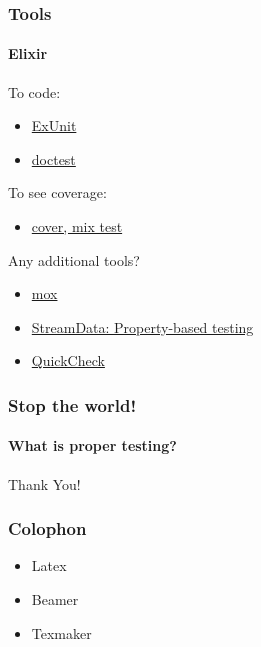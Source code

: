\documentclass{beamer}
\begin{document}
  \begin{frame}
    \frametitle{Tools}
    \framesubtitle{Elixir}
    
    To code:
    \begin{itemize}[<+->]
    \item \href{https://hexdocs.pm/ex_unit/ExUnit.html}{ExUnit}
    \item \href{https://hexdocs.pm/ex_unit/ExUnit.DocTest.html}{doctest}
    \end{itemize}
    To see coverage:
    \begin{itemize}[<+->]
    \item \href{http://erlang.org/doc/apps/tools/cover_chapter.html}{cover, mix test}
    \end{itemize}
    Any additional tools?
    \begin{itemize}[<+->]
    \item \href{https://github.com/plataformatec/mox}{mox}
    \item \href{https://elixir-lang.org/blog/2017/10/31/stream-data-property-based-testing-and-data-generation-for-elixir}{StreamData: Property-based testing}
    \item \href{http://www.quviq.com/downloads/}{QuickCheck}
    \end{itemize}    
  \end{frame}  

  \begin{frame}
    \frametitle{Stop the world!}
    \framesubtitle{What is proper testing?}
    
    
  \end{frame}

  \begin{frame}
    \begin{center}
    \Huge Thank You!
    \end{center}
  \end{frame}
    
  \begin{frame}
    \frametitle{Colophon}
    
    \begin{itemize}
    \item Latex
    \item Beamer
    \item Texmaker
    \end{itemize}
    
  \end{frame}
  
  
  
\end{document}

